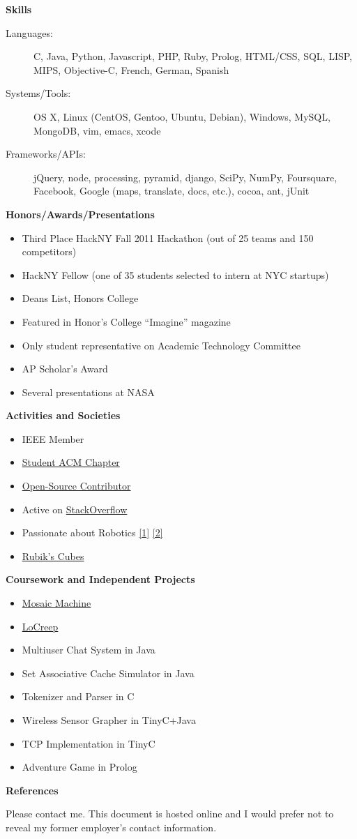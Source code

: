 \documentclass[letterpaper,11pt]{article}
\newcommand{\resitem}[1]{\item #1 \vspace{-2pt}}
\newcommand{\resheading}[1]{{\large \colorbox{mygrey}{\begin{minipage}{\textwidth}{\textbf{#1 \vphantom{p\^{E}}}}\end{minipage}}}}
\begin{document}
\pagebreak
\resheading{Skills}
\begin{description}
\item[Languages:]
C, Java, Python, Javascript, PHP, Ruby, Prolog, HTML/CSS, SQL, LISP, MIPS, Objective-C, French, German, Spanish
\item[Systems/Tools:]
OS X, Linux (CentOS, Gentoo, Ubuntu, Debian), Windows, MySQL, MongoDB, vim, emacs, xcode
\item[Frameworks/APIs:]
jQuery, node, processing, pyramid, django, SciPy, NumPy, Foursquare, Facebook, Google (maps, translate, docs, etc.), cocoa, ant, jUnit
\end{description}

\resheading{Honors/Awards/Presentations}
\begin{itemize}
   \item Third Place HackNY Fall 2011 Hackathon (out of 25 teams and 150 competitors)
   \item HackNY Fellow (one of 35 students selected to intern at NYC startups)
   \item Deans List, Honors College
   \item Featured in Honor's College ``Imagine'' magazine
   \item Only student representative on Academic Technology Committee
   \item AP Scholar's Award
   \item Several presentations at NASA
\end{itemize}
\resheading{Activities and Societies}
\begin{itemize}
   \resitem{IEEE Member}
   \resitem{\href{http://polaris.cs.wcu.edu/~acm/}{Student ACM Chapter}}
   \resitem{\href{https://github.com/ranman}{Open-Source Contributor}}
   \resitem{Active on 
      \href{http://stackoverflow.com/users/240004/ranman}
   {StackOverflow}}
   \resitem{Passionate about Robotics
      \href{http://robotics.punahou.edu/}{[1]}
      \href{http://irg.arc.nasa.gov}{[2]}}
   \resitem{\href{http://www.youtube.com/user/ranman96734}{Rubik's Cubes}}
\end{itemize}
\resheading{Coursework and Independent Projects}
\begin{itemize}
   \resitem{\href{http://www.mosaicmachine.com/}{Mosaic Machine}}
   \resitem{\href{http://www.locreep.com/}{LoCreep}}
   \resitem{Multiuser Chat System in Java}
   \resitem{Set Associative Cache Simulator in Java}
   \resitem{Tokenizer and Parser in C}
   \resitem{Wireless Sensor Grapher in TinyC+Java}
   \resitem{TCP Implementation in TinyC}
   \resitem{Adventure Game in Prolog}
\end{itemize}
\pagebreak

\resheading{References}
Please contact me. This document is hosted online and I would prefer not to reveal my former employer's contact information.
\end{document}
